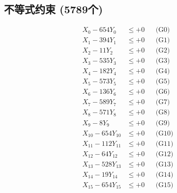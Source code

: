 \documentclass[a4paper,10pt]{article}
\begin{document}
\subsection{不等式约束 (5789个)}

\allowdisplaybreaks
{\small
\begin{align}
\allowbreak
\allowbreak
\allowbreak
\allowbreak
\allowbreak
\allowbreak
\allowbreak
\allowbreak
\allowbreak
\allowbreak
\allowbreak
\allowbreak
\allowbreak
\allowbreak
\allowbreak
\allowbreak
\allowbreak
\allowbreak
\allowbreak
\allowbreak
\allowbreak
\allowbreak
\allowbreak
\allowbreak
\allowbreak
\allowbreak
\allowbreak
\allowbreak
\allowbreak
\allowbreak
\allowbreak
\allowbreak
\allowbreak
\allowbreak
\allowbreak
\allowbreak
\allowbreak
\allowbreak
\allowbreak
\allowbreak
\allowbreak
\allowbreak
\allowbreak
\allowbreak
\allowbreak
\allowbreak
\allowbreak
\allowbreak
\allowbreak
\allowbreak
\allowbreak
\allowbreak
\allowbreak
\allowbreak
\allowbreak
\allowbreak
\allowbreak
\allowbreak
\allowbreak
\allowbreak
\allowbreak
\allowbreak
\allowbreak
\allowbreak
\allowbreak
\allowbreak
\allowbreak
\allowbreak
\allowbreak
\allowbreak
\allowbreak
\allowbreak
\allowbreak
\allowbreak
\allowbreak
\allowbreak
\allowbreak
\allowbreak
X_{0} - 654Y_{0} &\leq +0 && \text{(G0)} \\
\allowbreak
X_{1} - 394Y_{1} &\leq +0 && \text{(G1)} \\
X_{2} - 11Y_{2} &\leq +0 && \text{(G2)} \\
X_{3} - 535Y_{3} &\leq +0 && \text{(G3)} \\
X_{4} - 182Y_{4} &\leq +0 && \text{(G4)} \\
X_{5} - 573Y_{5} &\leq +0 && \text{(G5)} \\
X_{6} - 136Y_{6} &\leq +0 && \text{(G6)} \\
X_{7} - 589Y_{7} &\leq +0 && \text{(G7)} \\
X_{8} - 571Y_{8} &\leq +0 && \text{(G8)} \\
X_{9} - 8Y_{9} &\leq +0 && \text{(G9)} \\
X_{10} - 654Y_{10} &\leq +0 && \text{(G10)} \\
\allowbreak
X_{11} - 112Y_{11} &\leq +0 && \text{(G11)} \\
X_{12} - 64Y_{12} &\leq +0 && \text{(G12)} \\
X_{13} - 528Y_{13} &\leq +0 && \text{(G13)} \\
X_{14} - 19Y_{14} &\leq +0 && \text{(G14)} \\
X_{15} - 654Y_{15} &\leq +0 && \text{(G15)} \\

\end{align}}
\end{document}
